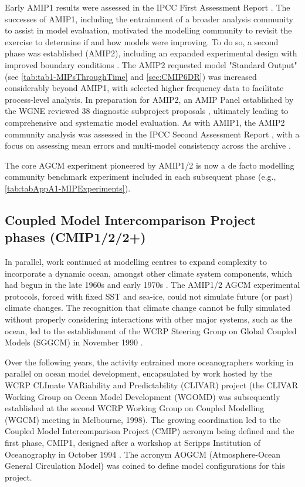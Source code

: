 \documentclass[manuscript]{copernicus}
\begin{document}
Early AMIP1 results were assessed in the IPCC First Assessment Report \citep[FAR;][]{gates_validation_1990}. The successes of AMIP1, including the entrainment of a broader analysis community to assist in model evaluation, motivated the modelling community to revisit the exercise to determine if and how models were improving. To do so, a second phase was established (AMIP2), including an expanded experimental design with improved boundary conditions \citep{liang_pcmdi_1997, taylor_pcmdi_2000}. The AMIP2 requested model "Standard Output" (see \autoref{tab:tab1-MIPsThroughTime} and \autoref{sec:CMIP6DR}) was increased considerably beyond AMIP1, with selected higher frequency data to facilitate process-level analysis. In preparation for AMIP2, an AMIP Panel established by the WGNE reviewed 38 diagnostic subproject proposals \citep{gleckler_amip_2001}, ultimately leading to comprehensive and systematic model evaluation. As with AMIP1, the AMIP2 community analysis was assessed in the IPCC Second Assessment Report \citep[SAR;][]{gates_climate_1996}, with a focus on assessing mean errors and multi-model consistency across the archive \citep{gates_amip_1995}.

The core AGCM experiment pioneered by AMIP1/2 is now a de facto modelling community benchmark experiment included in each subsequent phase (e.g., \autoref{tab:tabAppA1-MIPExperiments}).


\subsection{Coupled Model Intercomparison Project phases (CMIP1/2/2+)}
\label{sec:cmip1And2And2Plus}

In parallel, work continued at modelling centres to expand complexity to incorporate a dynamic ocean, amongst other climate system components, which had begun in the late 1960s and early 1970s \citep[e.g.,][]{manabe_climate_1969-1,bryan_global_1975,manabe_global_1975}. The AMIP1/2 AGCM experimental protocols, forced with fixed SST and sea-ice, could not simulate future (or past) climate changes. The recognition that climate change cannot be fully simulated without properly considering interactions with other major systems, such as the ocean, led to the establishment of the WCRP Steering Group on Global Coupled Models (SGGCM) in November 1990 \citep{meehl_role_2023}.

Over the following years, the activity entrained more oceanographers working in parallel on ocean model development, encapsulated by work hosted by the WCRP CLImate VARiability and Predictability (CLIVAR) project (the CLIVAR Working Group on Ocean Model Development (WGOMD) was subsequently established at the second WCRP Working Group on Coupled Modelling (WGCM) meeting in Melbourne, 1998). The growing coordination led to the Coupled Model Intercomparison Project (CMIP) acronym being defined and the first phase, CMIP1, designed after a workshop at Scripps Institution of Oceanography in October 1994 \citep{meehl_global_1995}. The acronym AOGCM (Atmosphere-Ocean General Circulation Model) was coined to define model configurations for this project.
\end{document}
